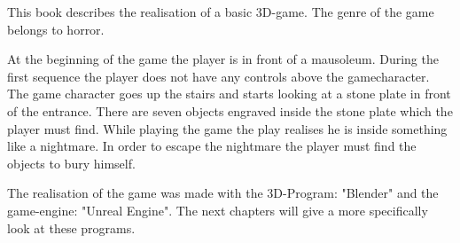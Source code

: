 This book describes the realisation of a basic 3D-game.
The genre of the game belongs to horror.

At the beginning of the game the player is in front of a mausoleum.
During the first sequence the player does not have any controls above the gamecharacter.
The game character goes up the stairs and starts looking at a stone plate  in front of the entrance.
There are seven objects engraved inside the stone plate which the player must find.
While playing the game the play realises he is inside something like a nightmare.
In order to escape the nightmare the player must find the objects to bury himself.

The realisation of the game was made with the 3D-Program: "Blender" and the game-engine: "Unreal Engine".
The next chapters will give a more specifically look at these programs.
